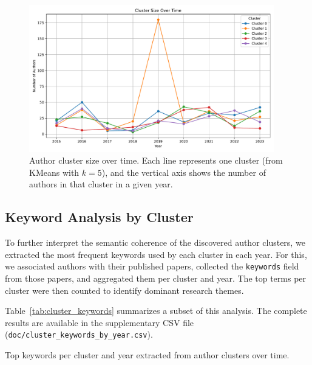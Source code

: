 \documentclass[10pt,a4paper]{article}
\begin{document}
\begin{figure}[H]
    \centering
    \includegraphics[width=0.95\textwidth]{img/cluster_distribution_over_time.pdf}
    \caption{Author cluster size over time. Each line represents one cluster (from KMeans with $k=5$), and the vertical axis shows the number of authors in that cluster in a given year.}
    \label{fig:cluster_evolution}
\end{figure}

\subsection{Keyword Analysis by Cluster}

To further interpret the semantic coherence of the discovered author clusters, we extracted the most frequent keywords used by each cluster in each year. For this, we associated authors with their published papers, collected the \texttt{keywords} field from those papers, and aggregated them per cluster and year. The top terms per cluster were then counted to identify dominant research themes.

Table~\ref{tab:cluster_keywords} summarizes a subset of this analysis. The complete results are available in the supplementary CSV file (\texttt{doc/cluster\_keywords\_by\_year.csv}).

\begin{table}[H]
\centering
\scriptsize
{}
\caption{Top keywords per cluster and year extracted from author clusters over time.}
\label{tab:cluster_keywords_csv}
\end{table}
\end{document}

